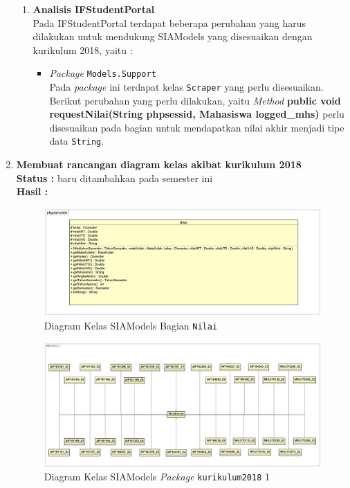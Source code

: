 \documentclass[a4paper,twoside]{article}
\begin{document}
\begin{enumerate}
\begin{enumerate}
			\item \textbf{Analisis IFStudentPortal}\\
			Pada IFStudentPortal terdapat beberapa perubahan yang harus dilakukan untuk mendukung SIAModels yang disesuaikan dengan kurikulum 2018, yaitu :
			\begin{itemize}
				\item \textit{Package} \texttt{Models.Support} \\
				Pada \textit{package} ini terdapat kelas \texttt{Scraper} yang perlu disesuaikan. Berikut perubahan yang perlu dilakukan, yaitu \textit{Method} \textbf{public void requestNilai(String phpsessid, Mahasiswa logged\_mhs)} perlu disesuaikan pada bagian untuk mendapatkan nilai akhir menjadi tipe data \texttt{String}.
			\end{itemize}

		\end{enumerate}
		
		
		\item \textbf{Membuat rancangan diagram kelas akibat kurikulum 2018}\\
		{\bf Status :} baru ditambahkan pada semester ini\\
		{\bf Hasil :} 
		
		\begin{figure}[H]
		\centering
		\includegraphics[scale=0.15]{Gambar/class-diagram-siamodels-new}
		\caption{Diagram Kelas SIAModels Bagian \texttt{Nilai}}
		\label{fig:siamodels_class_2018}
		\end{figure}

		\begin{figure}[H]
		\centering
		\includegraphics[scale=0.35]{Gambar/class-diagram-siamodels-mk-kurikulum-2018-2}
		\caption{Diagram Kelas SIAModels \textit{Package} \texttt{kurikulum2018} 1}
		\label{fig:siamodels_class_2018_kurikulum_1}
		\end{figure}


\end{enumerate}
\end{document}
